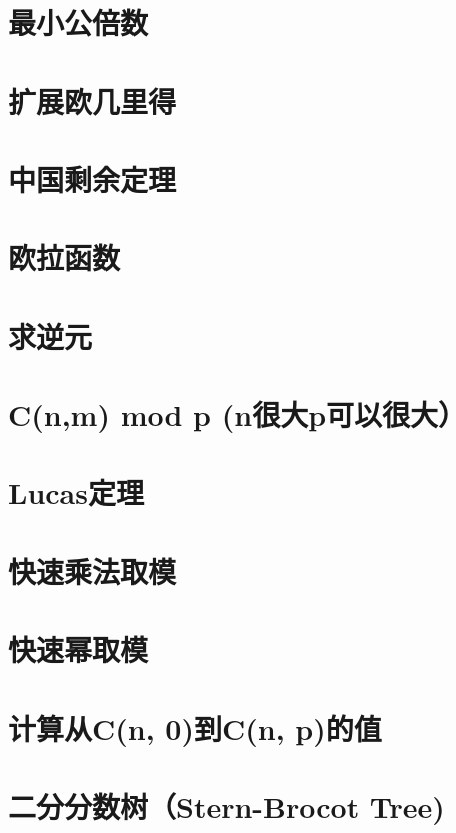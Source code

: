 \section{最小公倍数}
\raggedbottom
\hrulefill
\section{扩展欧几里得}
\raggedbottom
\hrulefill
\section{中国剩余定理}
\raggedbottom
\hrulefill
\section{欧拉函数}
\raggedbottom
\hrulefill
\section{求逆元}
\raggedbottom
\hrulefill
\section{C(n,m) mod p (n很大p可以很大）}
\raggedbottom
\hrulefill
\section{Lucas定理}
\raggedbottom
\hrulefill
\section{快速乘法取模}
\raggedbottom
\hrulefill
\section{快速幂取模}
\raggedbottom
\hrulefill
\section{计算从C(n, 0)到C(n, p)的值}
\raggedbottom
\hrulefill
\section{二分分数树（Stern-Brocot Tree)}
\raggedbottom
\hrulefill
